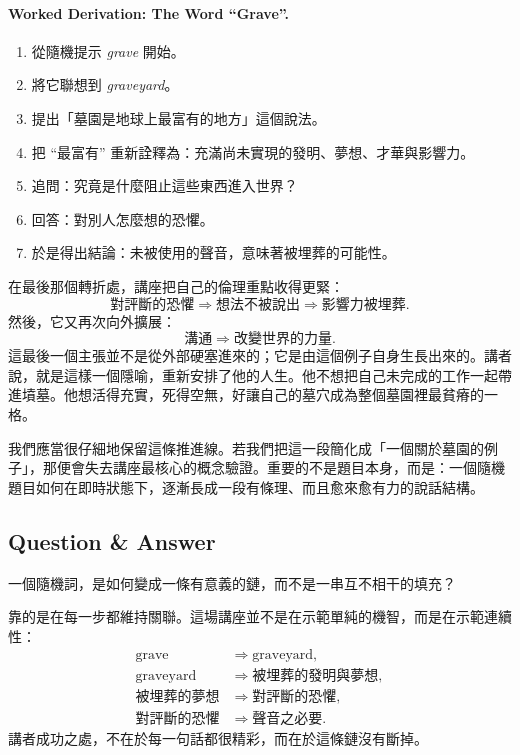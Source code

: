 \paragraph{Worked Derivation: The Word ``Grave''.}
\begin{enumerate}
\item 從隨機提示 \emph{grave} 開始。
\item 將它聯想到 \emph{graveyard}。
\item 提出「墓園是地球上最富有的地方」這個說法。
\item 把 ``最富有'' 重新詮釋為：充滿尚未實現的發明、夢想、才華與影響力。
\item 追問：究竟是什麼阻止這些東西進入世界？
\item 回答：對別人怎麼想的恐懼。
\item 於是得出結論：未被使用的聲音，意味著被埋葬的可能性。
\end{enumerate}

在最後那個轉折處，講座把自己的倫理重點收得更緊：
\begin{equation}
\text{對評斷的恐懼} \Longrightarrow \text{想法不被說出} \Longrightarrow \text{影響力被埋葬}.
\end{equation}
然後，它又再次向外擴展：
\begin{equation}
\text{溝通} \Longrightarrow \text{改變世界的力量}.
\end{equation}
這最後一個主張並不是從外部硬塞進來的；它是由這個例子自身生長出來的。講者說，就是這樣一個隱喻，重新安排了他的人生。他不想把自己未完成的工作一起帶進墳墓。他想活得充實，死得空無，好讓自己的墓穴成為整個墓園裡最貧瘠的一格。

我們應當很仔細地保留這條推進線。若我們把這一段簡化成「一個關於墓園的例子」，那便會失去講座最核心的概念驗證。重要的不是題目本身，而是：一個隨機題目如何在即時狀態下，逐漸長成一段有條理、而且愈來愈有力的說話結構。

\subsection{Question \& Answer}

一個隨機詞，是如何變成一條有意義的鏈，而不是一串互不相干的填充？

靠的是在每一步都維持關聯。這場講座並不是在示範單純的機智，而是在示範連續性：
\begin{align}
\text{grave} &\Longrightarrow \text{graveyard},\\
\text{graveyard} &\Longrightarrow \text{被埋葬的發明與夢想},\\
\text{被埋葬的夢想} &\Longrightarrow \text{對評斷的恐懼},\\
\text{對評斷的恐懼} &\Longrightarrow \text{聲音之必要}.
\end{align}
講者成功之處，不在於每一句話都很精彩，而在於這條鏈沒有斷掉。

